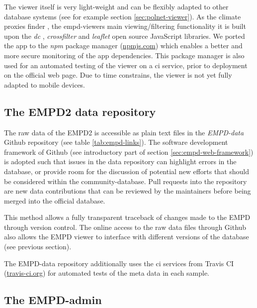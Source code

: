 \begin{refsection}
The viewer itself is very light-weight and can be flexibly adapted to other database systems (see for example section \ref{sec:polnet-viewer}). As the climate proxies finder \citep{BollietBrockmannMassonDelmotteEtAl2016, Brockmann2016}, the \gls{empd}-viewers main viewing/filtering functionality it is built upon the \textit{dc} \citep{ZhuDevelopers2019}, \textit{crossfilter} \citep{Squarecrossfiltercontributors2019} and \textit{leaflet} \citep{Agafonkin2019} open source JavaScript libraries. We ported the app to the \textit{npm} package manager (\href{https://www.npmjs.com/}{npmjs.com}) which enables a better and more secure monitoring of the app dependencies. This package manager is also used for an automated testing of the viewer on a \gls{ci} service, prior to deployment on the official web page. Due to time constrains, the viewer is not yet fully adapted to mobile devices. 

\subsection{The EMPD2 data repository}\label{sec:empd-data}

The raw data of the EMPD2 is accessible as plain text files in the \textit{EMPD-data} Github repository (see table \ref{tab:empd-links}). The software development framework of Github (see introductory part of section \ref{sec:empd-web-framework}) is adopted such that issues in the data repository can highlight errors in the database, or provide room for the discussion of potential new efforts that should be considered within the community-database. Pull requests into the repository are new data contributions that can be reviewed by the maintainers before being merged into the official database.

This method allows a fully transparent traceback of changes made to the EMPD through version control. The online access to the raw data files through Github also allows the EMPD viewer to interface with different versions of the database (see previous section). 

The EMPD-data repository additionally uses the \gls{ci} services from Travis CI (\href{https://travis-ci.org/}{travis-ci.org}) for automated tests of the meta data in each sample. 


\subsection{The EMPD-admin}\label{sec:empd-admin}


\end{refsection}
